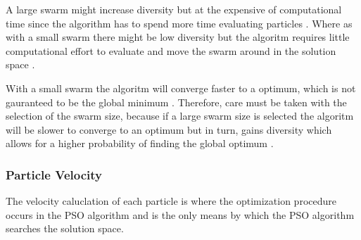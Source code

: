 A large swarm might increase diversity but at the expensive of computational time since the algorithm has to spend more time evaluating particles \cite{FundamentalSwarm,CompuIntelligenceIntro}. Where as with a small swarm there might be low diversity but the algoritm requires little computational effort to evaluate and move the swarm around in the solution space \cite{FundamentalSwarm,CompuIntelligenceIntro}.

With a small swarm the algoritm will converge faster to a optimum, which is not gauranteed to be the global minimum \cite{FundamentalSwarm,CompuIntelligenceIntro}. Therefore, care must be taken with the selection of the swarm size, because if a large swarm size is selected the algoritm will be slower to converge to an optimum but in turn, gains diversity which allows for a higher probability of finding the global optimum \cite{PSOPESO}.
\subsubsection{Particle Velocity}
\label{sec:particleVelocity}
The velocity caluclation of each particle is where the optimization procedure occurs in the PSO algorithm and is the only means by which the PSO algorithm searches the solution space. 

